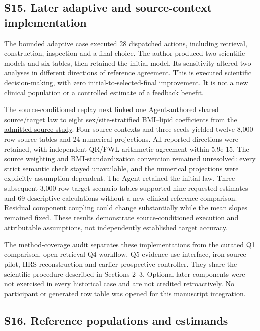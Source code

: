 \documentclass[11pt,letterpaper]{article}
\begin{document}
\endgroup

\subsection*{S15. Later adaptive and source-context implementation}

The bounded adaptive case executed 28 dispatched actions, including retrieval, construction, inspection and a final choice. The author produced two scientific models and six tables, then retained the initial model. Its sensitivity altered two analyses in different directions of reference agreement. This is executed scientific decision-making, with zero initial-to-selected-final improvement. It is not a new clinical population or a controlled estimate of a feedback benefit.


The source-conditioned replay next linked one Agent-authored shared source/\allowbreak{}target law to eight sex/\allowbreak{}site-stratified BMI–\allowbreak{}lipid coefficients from the \href{https://doi.org/10.1136/bmjgh-2019-001542}{admitted source study}. Four source contexts and three seeds yielded twelve 8,000-row source tables and 24 numerical projections. All reported directions were retained, with independent QR/\allowbreak{}FWL arithmetic agreement within 5.9e-15. The source weighting and BMI-standardization convention remained unresolved: every strict semantic check stayed unavailable, and the numerical projections were explicitly assumption-dependent. The Agent retained the initial law. Three subsequent 3,000-row target-scenario tables supported nine requested estimates and 69 descriptive calculations without a new clinical-reference comparison. Residual component coupling could change substantially while the mean slopes remained fixed. These results demonstrate source-conditioned execution and attributable assumptions, not independently established target accuracy.


The method-coverage audit separates these implementations from the curated Q1 comparison, open-retrieval Q4 workflow, Q5 evidence-use interface, iron source pilot, HRS reconstruction and earlier prospective controller. They share the scientific procedure described in Sections 2–\allowbreak{}3. Optional later components were not exercised in every historical case and are not credited retroactively. No participant or generated row table was opened for this manuscript integration.


\clearpage

\subsection*{S16. Reference populations and estimands}
\end{document}
